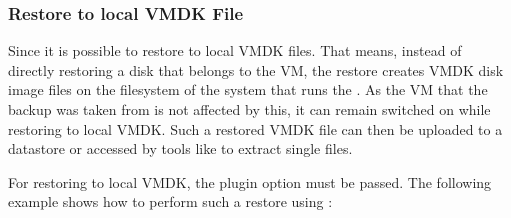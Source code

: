 \subsubsection{Restore to local VMDK File}

Since 
it is possible to restore to local VMDK files. That means, instead of directly
restoring a disk that belongs to the VM, the restore creates VMDK disk image files
on the filesystem of the system that runs the \bareosFd. As the VM that the backup
was taken from is not affected by this, it can remain switched on while restoring
to local VMDK. Such a restored VMDK file can then be uploaded to a \vSphere datastore
or accessed by tools like  to extract single files.

For restoring to local VMDK, the plugin option  must be passed.
The following example shows how to perform such a restore using :

